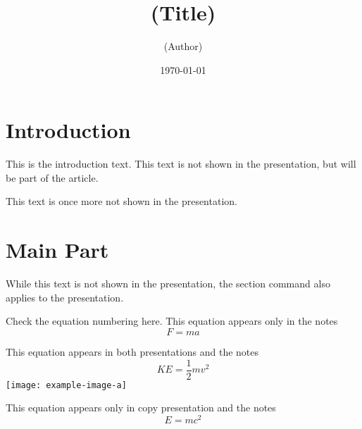 \usepackage{amsmath}
\usepackage[capitalize]{cleveref}
\usepackage{catchfilebetweentags}

\begin{frame}[label=title]
\title{(Title)}
\author{(Author)}
\date{\today}
\maketitle
\end{frame}
\section{Introduction}
\label{sec:intro}
This is the introduction text. This text is not shown in the
presentation, but will be part of the article.

This text is once more not shown in the presentation.
\section{Main Part}
\label{sec:main}
While this text is not shown in the presentation, the section command
also applies to the presentation.

Check the equation numbering here. This equation appears only in the notes
\begin{equation}
F = ma\label{eq:fma}
\end{equation}
\begin{frame}[label=both]
This equation appears in both presentations and the notes
	\begin{equation}
KE = \frac{1}{2}mv^2\label{eq:ke}
\end{equation}
\texttt{[image: example-image-a]}
\end{frame}
\begin{frame}[label=copy]
This equation appears only in copy presentation and the notes
	\begin{equation}
E = mc^2\label{eq:emc2}
\end{equation}
\end{frame}
